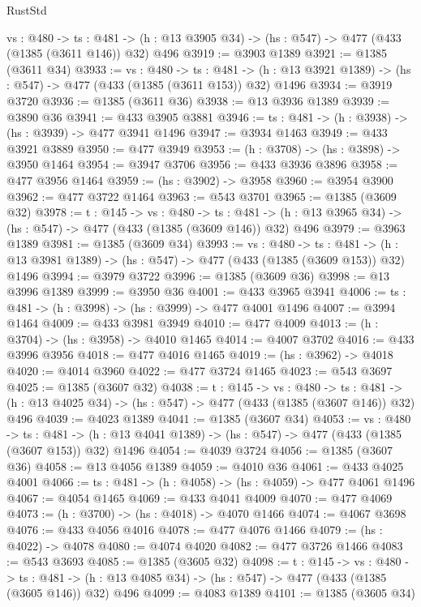 \begin{lexlean}{RustStd}
\begin{coremodule}
{\begin{coremodule}
{{{{{{{{{{{{{{{{  {vs : @480} ->
  {ts : @481} -> (h : @13 @3905 @34) -> (hs : @547) -> @477 (@433 (@1385 (@3611 @146)) @32) @496
@3919 := @3903 @1389
@3921 := @1385 (@3611 @34)
@3933 := {vs : @480} ->
  {ts : @481} -> (h : @13 @3921 @1389) -> (hs : @547) -> @477 (@433 (@1385 (@3611 @153)) @32) @1496
@3934 := @3919 @3720
@3936 := @1385 (@3611 @36)
@3938 := @13 @3936 @1389
@3939 := @3890 @36
@3941 := @433 @3905 @3881
@3946 := {ts : @481} -> (h : @3938) -> (hs : @3939) -> @477 @3941 @1496
@3947 := @3934 @1463
@3949 := @433 @3921 @3889
@3950 := @477 @3949
@3953 := (h : @3708) -> (hs : @3898) -> @3950 @1464
@3954 := @3947 @3706
@3956 := @433 @3936 @3896
@3958 := @477 @3956 @1464
@3959 := (hs : @3902) -> @3958
@3960 := @3954 @3900
@3962 := @477 @3722 @1464
@3963 := @543 @3701
@3965 := @1385 (@3609 @32)
@3978 := {t : @145} ->
  {vs : @480} ->
  {ts : @481} -> (h : @13 @3965 @34) -> (hs : @547) -> @477 (@433 (@1385 (@3609 @146)) @32) @496
@3979 := @3963 @1389
@3981 := @1385 (@3609 @34)
@3993 := {vs : @480} ->
  {ts : @481} -> (h : @13 @3981 @1389) -> (hs : @547) -> @477 (@433 (@1385 (@3609 @153)) @32) @1496
@3994 := @3979 @3722
@3996 := @1385 (@3609 @36)
@3998 := @13 @3996 @1389
@3999 := @3950 @36
@4001 := @433 @3965 @3941
@4006 := {ts : @481} -> (h : @3998) -> (hs : @3999) -> @477 @4001 @1496
@4007 := @3994 @1464
@4009 := @433 @3981 @3949
@4010 := @477 @4009
@4013 := (h : @3704) -> (hs : @3958) -> @4010 @1465
@4014 := @4007 @3702
@4016 := @433 @3996 @3956
@4018 := @477 @4016 @1465
@4019 := (hs : @3962) -> @4018
@4020 := @4014 @3960
@4022 := @477 @3724 @1465
@4023 := @543 @3697
@4025 := @1385 (@3607 @32)
@4038 := {t : @145} ->
  {vs : @480} ->
  {ts : @481} -> (h : @13 @4025 @34) -> (hs : @547) -> @477 (@433 (@1385 (@3607 @146)) @32) @496
@4039 := @4023 @1389
@4041 := @1385 (@3607 @34)
@4053 := {vs : @480} ->
  {ts : @481} -> (h : @13 @4041 @1389) -> (hs : @547) -> @477 (@433 (@1385 (@3607 @153)) @32) @1496
@4054 := @4039 @3724
@4056 := @1385 (@3607 @36)
@4058 := @13 @4056 @1389
@4059 := @4010 @36
@4061 := @433 @4025 @4001
@4066 := {ts : @481} -> (h : @4058) -> (hs : @4059) -> @477 @4061 @1496
@4067 := @4054 @1465
@4069 := @433 @4041 @4009
@4070 := @477 @4069
@4073 := (h : @3700) -> (hs : @4018) -> @4070 @1466
@4074 := @4067 @3698
@4076 := @433 @4056 @4016
@4078 := @477 @4076 @1466
@4079 := (hs : @4022) -> @4078
@4080 := @4074 @4020
@4082 := @477 @3726 @1466
@4083 := @543 @3693
@4085 := @1385 (@3605 @32)
@4098 := {t : @145} ->
  {vs : @480} ->
  {ts : @481} -> (h : @13 @4085 @34) -> (hs : @547) -> @477 (@433 (@1385 (@3605 @146)) @32) @496
@4099 := @4083 @1389
@4101 := @1385 (@3605 @34)
}}}}}}}}}}}}}}}}
\end{coremodule}}
\end{coremodule}
\end{lexlean}
